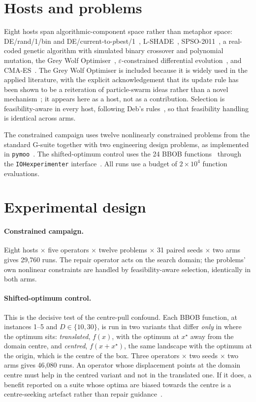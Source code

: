 \documentclass[11pt,a4paper]{article}
\begin{document}
\section{Hosts and problems}

Eight hosts span algorithmic-component space rather than metaphor space: DE/rand/1/bin
and DE/current-to-$p$best/1~\citep{storn1997}, L-SHADE~\citep{tanabe2014},
SPSO-2011~\citep{zambrano2013}, a real-coded genetic algorithm with simulated binary
crossover and polynomial mutation, the Grey Wolf Optimiser~\citep{mirjalili2014},
$\varepsilon$-constrained differential evolution~\citep{takahama2009}, and
CMA-ES~\citep{hansen2001}. The Grey Wolf Optimiser is included because it is widely used
in the applied literature, with the explicit acknowledgement that its update rule has been
shown to be a reiteration of particle-swarm ideas rather than a novel
mechanism~\citep{camacho2022}; it appears here as a host, not as a contribution.
Selection is feasibility-aware in every host, following Deb's rules~\citep{deb2000}, so
that feasibility handling is identical across arms.

The constrained campaign uses twelve nonlinearly constrained problems from the standard
G-suite together with two engineering design problems, as implemented in
\texttt{pymoo}~\citep{blank2020}. The shifted-optimum control uses the 24 BBOB
functions~\citep{hansen2021} through the \texttt{IOHexperimenter}
interface~\citep{denobel2023}. All runs use a budget of $2\times10^4$ function
evaluations.

\section{Experimental design}

\paragraph{Constrained campaign.} Eight hosts $\times$ five operators $\times$ twelve
problems $\times$ 31 paired seeds $\times$ two arms gives 29{,}760 runs. The repair
operator acts on the search domain; the problems' own nonlinear constraints are handled
by feasibility-aware selection, identically in both arms.

\paragraph{Shifted-optimum control.} This is the decisive test of the centre-pull
confound. Each BBOB function, at instances 1--5 and $D \in \{10,30\}$, is run in two
variants that differ \emph{only} in where the optimum sits: \emph{translated}, $f(x)$,
with the optimum at $x^\star$ away from the domain centre, and \emph{centred},
$f(x+x^\star)$, the same landscape with the optimum at the origin, which is the centre of
the box. Three operators $\times$ two seeds $\times$ two arms gives 46{,}080 runs. An
operator whose displacement points at the domain centre must help in the centred variant
and not in the translated one. If it does, a benefit reported on a suite whose optima are
biased towards the centre is a centre-seeking artefact rather than repair
guidance~\citep{kudela2022}.
\end{document}

